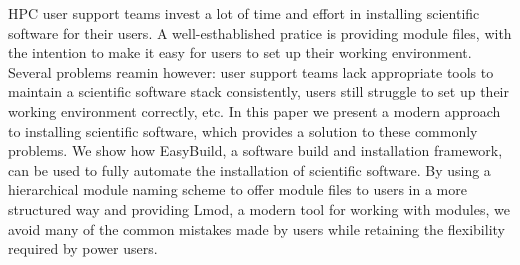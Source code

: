 
HPC user support teams invest a lot of time and effort in installing scientific
software for their users. A well-esthablished pratice is providing module files,
with the intention to make it easy for users to set up their working environment.
Several problems reamin however: user support teams lack appropriate tools to maintain a
scientific software stack consistently, users still struggle to set up their working
environment correctly, etc.
In this paper we present a modern approach to installing scientific software, which provides
a solution to these commonly problems. We show how EasyBuild, a software build and
installation framework, can be used to fully automate the installation of scientific software.
By using a hierarchical module naming scheme to offer module files to users in a more structured
way and providing Lmod, a modern tool for working with modules, we avoid many of the common
mistakes made by users while retaining the flexibility required by power users. 
